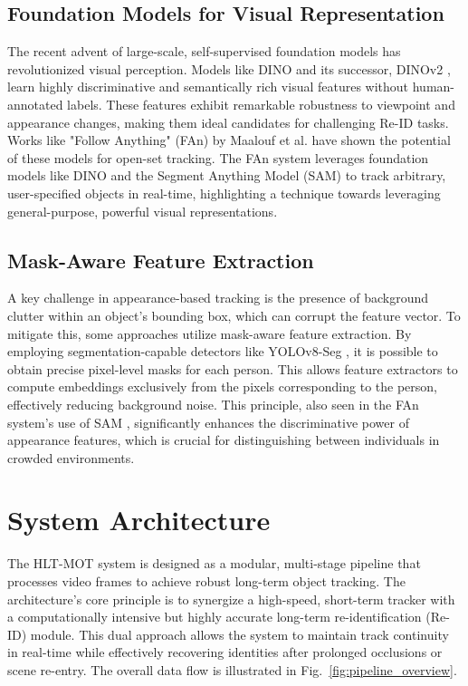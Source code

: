 \documentclass[conference]{IEEEtran}
\begin{document}
\subsection{Foundation Models for Visual Representation}
The recent advent of large-scale, self-supervised foundation models has revolutionized visual perception. Models like DINO \cite{DBLP:journals/corr/abs-2104-14294} and its successor, DINOv2 \cite{oquab2023dinov2}, learn highly discriminative and semantically rich visual features without human-annotated labels. These features exhibit remarkable robustness to viewpoint and appearance changes, making them ideal candidates for challenging Re-ID tasks.
Works like "Follow Anything" (FAn) by Maalouf et al. \cite{maalouf2023follow} have shown the potential of these models for open-set tracking. The FAn system leverages foundation models like DINO and the Segment Anything Model (SAM) \cite{10378323} to track arbitrary, user-specified objects in real-time, highlighting a technique towards leveraging general-purpose, powerful visual representations.
\subsection{Mask-Aware Feature Extraction}
A key challenge in appearance-based tracking is the presence of background clutter within an object's bounding box, which can corrupt the feature vector. To mitigate this, some approaches utilize mask-aware feature extraction. By employing segmentation-capable detectors like YOLOv8-Seg \cite{Jocher_Ultralytics_YOLO_2023,10533619}, it is possible to obtain precise pixel-level masks for each person. This allows feature extractors to compute embeddings exclusively from the pixels corresponding to the person, effectively reducing background noise. This principle, also seen in the FAn system's use of SAM \cite{maalouf2023follow}, significantly enhances the discriminative power of appearance features, which is crucial for distinguishing between individuals in crowded environments.
\section{System Architecture}
The HLT-MOT system is designed as a modular, multi-stage pipeline that processes video frames to achieve robust long-term object tracking. The architecture's core principle is to synergize a high-speed, short-term tracker with a computationally intensive but highly accurate long-term re-identification (Re-ID) module. This dual approach allows the system to maintain track continuity in real-time while effectively recovering identities after prolonged occlusions or scene re-entry. The overall data flow is illustrated in Fig.~\ref{fig:pipeline_overview}.
\end{document}
